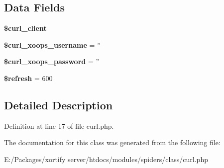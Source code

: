 \subsection*{Data Fields}
\begin{DoxyCompactItemize}
\item 
\hypertarget{class_c_u_r_l_spiders_exchange_a402f2112991f3227835af80e9df33e38}{{\bfseries \$curl\-\_\-client}}\label{class_c_u_r_l_spiders_exchange_a402f2112991f3227835af80e9df33e38}

\item 
\hypertarget{class_c_u_r_l_spiders_exchange_aab7480ba9f878a02b2c9fd43922fa070}{{\bfseries \$curl\-\_\-xoops\-\_\-username} = ''}\label{class_c_u_r_l_spiders_exchange_aab7480ba9f878a02b2c9fd43922fa070}

\item 
\hypertarget{class_c_u_r_l_spiders_exchange_a6c9851541ed3826c67cfe7224c38f0b8}{{\bfseries \$curl\-\_\-xoops\-\_\-password} = ''}\label{class_c_u_r_l_spiders_exchange_a6c9851541ed3826c67cfe7224c38f0b8}

\item 
\hypertarget{class_c_u_r_l_spiders_exchange_a8527f826b6959aaa92b0e51ee427ba1a}{{\bfseries \$refresh} = 600}\label{class_c_u_r_l_spiders_exchange_a8527f826b6959aaa92b0e51ee427ba1a}

\end{DoxyCompactItemize}


\subsection{Detailed Description}


Definition at line 17 of file curl.\-php.



The documentation for this class was generated from the following file\-:\begin{DoxyCompactItemize}
\item 
E\-:/\-Packages/xortify server/htdocs/modules/spiders/class/curl.\-php\end{DoxyCompactItemize}
